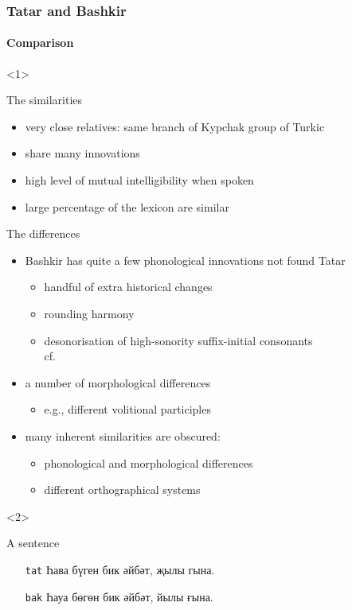 \documentclass[10pt,xetex]{beamer} %
\newcommand{\compresslist}{
	\setlength{\itemsep}{1pt}
	\setlength{\parskip}{0pt}
	\setlength{\parsep}{0pt}
}
\begin{document}
\begin{frame}
	\frametitle{Tatar and Bashkir}
	\framesubtitle{Comparison}
 
  \begin{onlyenv}<1>
	 \begin{block}{The similarities}
	 	\begin{itemize}\compresslist
			\item very close relatives: same branch of Kypchak group of Turkic
			\item share many innovations
			\item high level of mutual intelligibility when spoken
			\item large percentage of the lexicon are similar
		\end{itemize}
	\end{block}

	\begin{block}{The differences}
		\begin{itemize}\compresslist
			\item Bashkir has quite a few phonological innovations not found Tatar
			\begin{itemize}
				\item handful of extra historical changes
				\item rounding harmony
				\item desonorisation of high-sonority suffix-initial consonants\\cf.\ \citet{washington10}
			\end{itemize}
			\item a number of morphological differences
			\begin{itemize}
				\item e.g., different volitional participles
			\end{itemize}
			\item many inherent similarities are obscured:
			\begin{itemize}
				\item phonological and morphological differences
				\item different orthographical systems
			\end{itemize}
		\end{itemize}
	\end{block}
  \end{onlyenv}
  \begin{onlyenv}<2>
	\begin{block}{A sentence}
		\begin{itemize}
			\item[{\small {\tt tat}}] Һава бүген бик әйбәт, җылы гына.  \\
			{}
			\item[{\small {\tt bak}}] Һауа бөгөн бик әйбәт, йылы ғына. \\
			{}
		\end{itemize}
	\end{block}


\end{onlyenv}
\end{frame}
\end{document}
